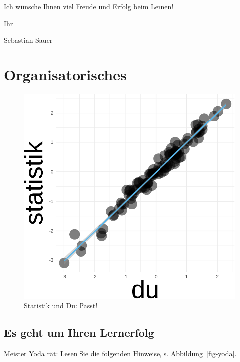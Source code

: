 \documentclass[
  letterpaper,
  twoside,
  open=any]{scrbook}
\theoremstyle{definition}
\theoremstyle{definition}
\theoremstyle{definition}
\theoremstyle{remark}
\begin{document}
Ich wünsche Ihnen viel Freude und Erfolg beim Lernen!

Ihr

Sebastian Sauer

\clearpage 
\setcounter{tocdepth}{1}
\tableofcontents 

\cleardoublepage  %
\setcounter{page}{1}    %


\chapter{Organisatorisches}\label{organisatorisches}

\begin{figure}[H]

{\centering \includegraphics[width=0.33\linewidth,height=\textheight,keepaspectratio]{005-orga_files/figure-pdf/statistik-und-du-guter-fit-1.pdf}

}

\caption{Statistik und Du: Passt!}

\end{figure}%

\section{Es geht um Ihren Lernerfolg}\label{es-geht-um-ihren-lernerfolg}

Meister Yoda rät: Lesen Sie die folgenden Hinweise, s.
Abbildung~\ref{fig-yoda}.
\end{document}
